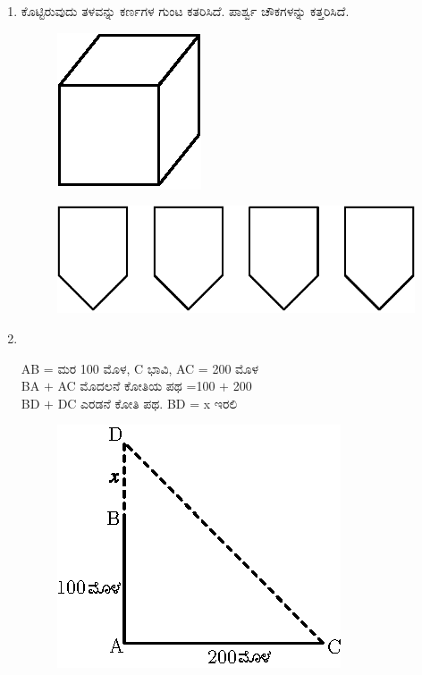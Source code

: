 \begin{enumerate}
\item ಕೊಟ್ಟಿರುವುದು ತಳವನ್ನು ಕರ್ಣಗಳ ಗುಂಟ ಕತರಿಸಿದೆ. ಪಾರ್ಶ್ವ ಚೌಕಗಳನ್ನು ಕತ್ತರಿಸಿದೆ. 
\begin{figure}[H]
\centering
\includegraphics[scale=1.1]{images/chap12/ans22a.eps}
\end{figure}

\begin{figure}[H]
\centering
\includegraphics[scale=1.2]{images/chap12/ans22b.eps}
\end{figure}

\item 
~

\begin{minipage}[c]{4cm}
AB =  ಮರ 100 ಮೊಳ, C ಭಾವಿ, AC = 200 ಮೊಳ\\
BA $+$ AC ಮೊದಲನೆ ಕೋತಿಯ ಪಥ =100 $+$ 200\\
BD $+$ DC ಎರಡನೆ ಕೋತಿ ಪಥ. BD = x ಇರಲಿ 
\end{minipage}
\qquad
\begin{minipage}[c]{4cm}
\begin{figure}[H]
\centering
\includegraphics{images/chap12/ans23.eps}
\end{figure}
\end{minipage}


\end{enumerate}
